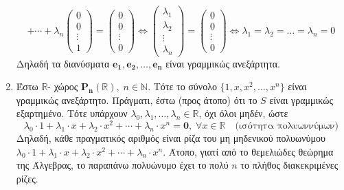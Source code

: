 \begin{examples}
\begin{enumerate}
\[                + \cdots + \lambda _{n} 
                \begin{pmatrix*} 0 \\ 0 \\ \vdots \\ 1 \end{pmatrix*}
                = 
                \begin{pmatrix*} 0 \\ 0 \\ \vdots \\ 0 \end{pmatrix*} 
                \Leftrightarrow 
                \begin{pmatrix*} \lambda _{1} \\ \lambda _{2} \\ \vdots \\ 
                \lambda _{n} \end{pmatrix*} = 
                \begin{pmatrix*} 0 \\ 0 \\ \vdots \\ 0 \end{pmatrix*}
                \Leftrightarrow 
                \lambda _{1} = \lambda _{2} = \dots = \lambda _{n} = 0 
            \]
            Δηλαδή τα διανύσματα $ \mathbf{e_{1}}, \mathbf{e_{2}}, \ldots, 
        \mathbf{e_{n}} $ είναι γραμμικώς ανεξάρτητα.
        \item Έστω $ \mathbb{R} $- χώρος $ \mathbf{P_{n}}(\mathbb{R}), \; n 
            \in \mathbb{N} $. Τότε το σύνολο $ \{1,x,x^{2}, \ldots,x^{n} \} $ 
            είναι γραμμικώς ανεξάρτητο. Πράγματι, έστω (προς άτοπο) ότι το 
            $S$ είναι γραμμικώς εξαρτημένο. Τότε υπάρχουν 
            $ \lambda _{0}, \lambda _{1}, \ldots, \lambda _{n} \in \mathbb{R} $, 
            όχι όλοι μηδέν, ώστε
            \[
                \lambda _{0} \cdot 1 + \lambda _{1} \cdot x + \lambda _{2} 
                \cdot x^{2} + \cdots + \lambda _{n} \cdot x^{n} = \mathbf{0}, \; 
                \forall x \in \mathbb{R} \quad \text{(ισότητα πολυωννύμων)}   
            \]
            Δηλαδή, κάθε πραγματικός αριθμός είναι ρίζα του μη μηδενικού πολυωνύμου 
            $ \lambda _{0} \cdot 1 + \lambda _{1} \cdot x + \lambda _{2} 
            \cdot x^{2} + \cdots + \lambda _{n} \cdot x^{n} $. Άτοπο, γιατί από 
            το θεμελιώδες θεώρημα της Άλγεβρας, το παραπάνω πολυώνυμο έχει το 
            πολύ $ n $ το πλήθος διακεκριμένες ρίζες.
    \end{enumerate}
\end{examples}

